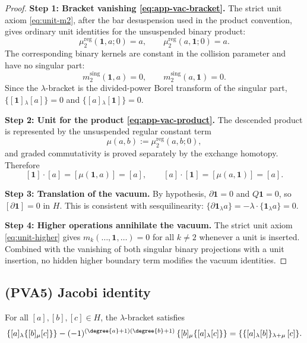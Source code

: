 \begin{proof}
\textbf{Step 1: Bracket vanishing \eqref{eq:app-vac-bracket}.}
The strict unit axiom \eqref{eq:unit-m2}, after the bar
desuspension used in the product convention, gives ordinary unit
identities for the unsuspended binary product:
\[
\mu_2^{\mathrm{reg}}(\mathbf 1,a;0)=a,\qquad
\mu_2^{\mathrm{reg}}(a,\mathbf 1;0)=a.
\]
The corresponding binary kernels are constant in the collision
parameter and have no singular part:
\[
m_2^{\mathrm{sing}}(\mathbf{1},a) = 0,
\qquad
m_2^{\mathrm{sing}}(a,\mathbf{1}) = 0.
\]
Since the $\lambda$-bracket is the divided-power Borel transform of
the singular part, \(\{[\mathbf 1]{}_\lambda[a]\}=0\) and
\(\{[a]{}_\lambda[\mathbf 1]\}=0\).

\textbf{Step 2: Unit for the product \eqref{eq:app-vac-product}.}
The descended product is represented by the unsuspended regular
constant term
\[
\mu(a,b):=\mu_2^{\mathrm{reg}}(a,b;0),
\]
and graded commutativity is proved separately by the exchange
homotopy.  Therefore
\[
[\mathbf 1]\cdot[a]=[\mu(\mathbf 1,a)]=[a],
\qquad
[a]\cdot[\mathbf 1]=[\mu(a,\mathbf 1)]=[a].
\]

\textbf{Step 3: Translation of the vacuum.}
By hypothesis, $\partial\mathbf{1} = 0$ and $Q\mathbf{1} = 0$, so $[\partial\mathbf{1}] = 0$ in $H$. This is consistent with sesquilinearity: $\{\partial\mathbf{1}{}_\lambda a\} = -\lambda\cdot\{\mathbf{1}{}_\lambda a\} = 0$.

\textbf{Step 4: Higher operations annihilate the vacuum.}
The strict unit axiom \eqref{eq:unit-higher} gives $m_k(\ldots,\mathbf{1},\ldots) = 0$ for all $k\neq 2$ whenever a unit is inserted. Combined with the vanishing of both singular binary projections with a unit insertion, no hidden higher boundary term modifies the vacuum identities.
\end{proof}

\subsection{(PVA5) Jacobi identity}

\begin{proposition}
\label{prop:app-Jacobi}
For all $[a],[b],[c]\in H$, the $\lambda$-bracket satisfies
\begin{equation}
\label{eq:app-Jacobi}
\{[a]{}_\lambda \{[b]{}_\mu [c]\}\} - (-1)^{(\degree{a}+1)(\degree{b}+1)}\,\{[b]{}_\mu \{[a]{}_\lambda [c]\}\} = \{\{[a]{}_\lambda [b]\}{}_{\lambda+\mu}\, [c]\}.
\end{equation}
\end{proposition}

